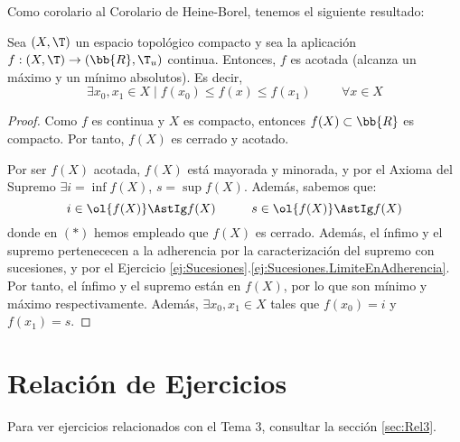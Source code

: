 Como corolario al Corolario de Heine-Borel, tenemos el siguiente resultado:
\begin{coro}
    Sea $(X,\T)$ un espacio topológico compacto y sea la aplicación $f:(X,\T)\to (\bb{R},\T_u)$ continua.    
    Entonces, $f$ es acotada (alcanza un máximo y un mínimo absolutos). Es decir,
    \begin{equation*}
        \exists x_0,x_1\in X \mid f(x_0) \leq f(x) \leq f(x_1) \hspace{1cm} \forall x\in X
    \end{equation*}
\end{coro}
\begin{proof}
    Como $f$ es continua y $X$ es compacto, entonces $f(X)\subset \bb{R}$ es compacto. Por tanto, $f(X)$ es cerrado y acotado.

    Por ser $f(X)$ acotada, $f(X)$ está mayorada y minorada, y por el Axioma del Supremo $\exists i=\inf f(X)$, $s=\sup f(X)$. Además, sabemos que:
    \begin{equation*}
        i\in \ol{f(X)}\AstIg f(X) \hspace{1cm}
        s\in \ol{f(X)}\AstIg f(X)
    \end{equation*}
    donde en $(\ast)$ hemos empleado que $f(X)$ es cerrado. Además, el ínfimo y el supremo pertenececen a la adherencia por la
    caracterización del supremo con sucesiones, y por el Ejercicio \ref{ej:Sucesiones}.\ref{ej:Sucesiones.LimiteEnAdherencia}.
    Por tanto, el ínfimo y el supremo están en $f(X)$, por lo que son mínimo y máximo respectivamente.
    Además, $\exists x_0,x_1\in X$ tales que $f(x_0)=i$ y $f(x_1)=s$.
\end{proof}


\section{Relación de Ejercicios}
Para ver ejercicios relacionados con el Tema 3, consultar la sección \ref{sec:Rel3}.